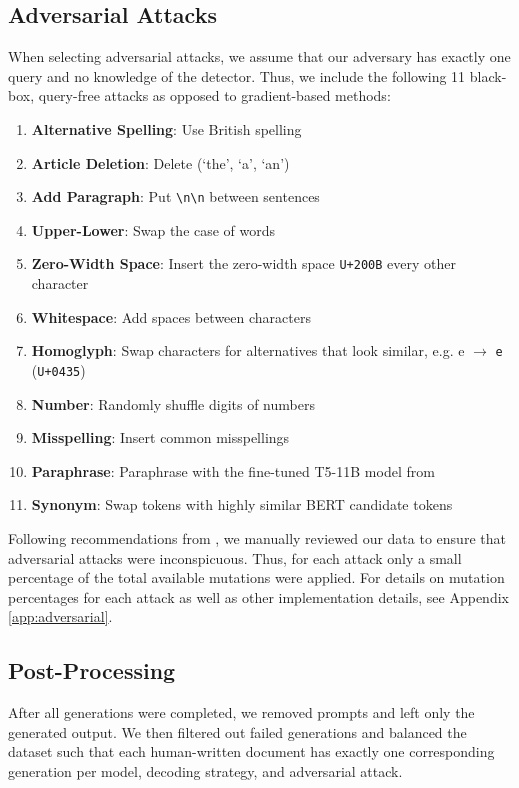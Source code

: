 \documentclass[11pt]{article}
\begin{document}
\subsection{Adversarial Attacks}
\label{sec:adversarial-attacks}
When selecting adversarial attacks, we assume that our adversary has exactly one query and no knowledge of the detector. Thus, we include the following 11 black-box, query-free attacks as opposed to gradient-based methods:
\begin{enumerate}[noitemsep]
    \item \textbf{Alternative Spelling}: Use British spelling
    \item \textbf{Article Deletion}: Delete (`the', `a', `an')
    \item \textbf{Add Paragraph}: Put \texttt{\textbackslash n\textbackslash n} between sentences
    \item \textbf{Upper-Lower}: Swap the case of words
    \item \textbf{Zero-Width Space}: Insert the zero-width space \texttt{U+200B} every other character
    \item \textbf{Whitespace}: Add spaces between characters
    \item \textbf{Homoglyph}: Swap characters for alternatives that look similar, e.g. e $\rightarrow$ \texttt{e} (\texttt{U+0435})
    \item \textbf{Number}: Randomly shuffle digits of numbers
    \item \textbf{Misspelling}: Insert common misspellings 
    \item \textbf{Paraphrase}: Paraphrase with the fine-tuned T5-11B model from \citet{krishna2023paraphrasing}
    \item \textbf{Synonym}: Swap tokens with highly similar BERT \cite{devlin-etal-2019-bert} candidate tokens   
\end{enumerate}

Following recommendations from \citet{dyrmishi-etal-2023-humans}, we manually reviewed our data to ensure that adversarial attacks were inconspicuous. Thus, for each attack only a small percentage of the total available mutations were applied. For details on mutation percentages for each attack as well as other implementation details, see Appendix \ref{app:adversarial}.

\subsection{Post-Processing}
After all generations were completed, we removed prompts and left only the generated output. We then filtered out failed generations and balanced the dataset such that each human-written document has exactly one corresponding generation per model, decoding strategy, and adversarial attack.
\end{document}
